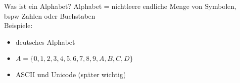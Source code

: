 \begin{frame}{Was ist ein Alphabet?}
	Alphabet = nichtleere endliche Menge von Symbolen, bspw Zahlen oder Buchstaben\\
	Beispiele:
	\begin{itemize}
		\item deutsches Alphabet
		\item $A = \{0, 1, 2, 3, 4, 5, 6, 7, 8, 9, A, B, C, D\}$
		\item ASCII und Unicode (später wichtig)
	\end{itemize}
\end{frame}
